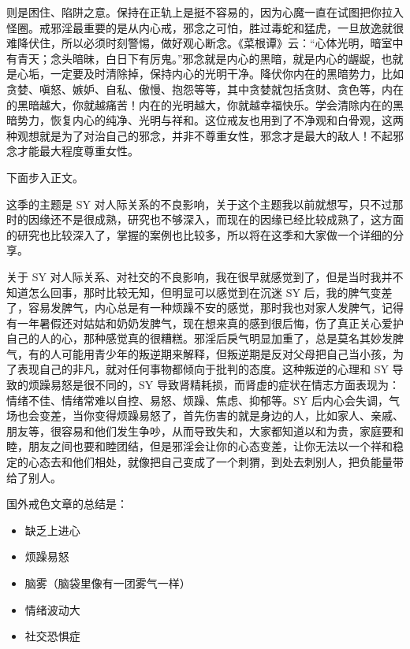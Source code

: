 \begin{case}
则是困住、陷阱之意。保持在正轨上是挺不容易的，因为心魔一直在试图把你拉入怪圈。戒邪淫最重要的是从内心戒，邪念之可怕，胜过毒蛇和猛虎，一旦放逸就很难降伏住，所以必须时刻警惕，做好观心断念。《菜根谭》云：“心体光明，暗室中有青天；念头暗昧，白日下有厉鬼。”邪念就是内心的黑暗，就是内心的龌龊，也就是心垢，一定要及时清除掉，保持内心的光明干净。降伏你内在的黑暗势力，比如贪婪、嗔怒、嫉妒、自私、傲慢、抱怨等等，其中贪婪就包括贪财、贪色等，内在的黑暗越大，你就越痛苦！内在的光明越大，你就越幸福快乐。学会清除内在的黑暗势力，恢复内心的纯净、光明与祥和。这位戒友也用到了不净观和白骨观，这两种观想就是为了对治自己的邪念，并非不尊重女性，邪念才是最大的敌人！不起邪念才能最大程度尊重女性。
\end{case}

下面步入正文。

这季的主题是 SY 对人际关系的不良影响，关于这个主题我以前就想写，只不过那时的因缘还不是很成熟，研究也不够深入，而现在的因缘已经比较成熟了，这方面的研究也比较深入了，掌握的案例也比较多，所以将在这季和大家做一个详细的分享。

关于 SY 对人际关系、对社交的不良影响，我在很早就感觉到了，但是当时我并不知道怎么回事，那时比较无知，但明显可以感觉到在沉迷 SY 后，我的脾气变差了，容易发脾气，内心总是有一种烦躁不安的感觉，那时我也对家人发脾气，记得有一年暑假还对姑姑和奶奶发脾气，现在想来真的感到很后悔，伤了真正关心爱护自己的人的心，那种感觉真的很糟糕。邪淫后戾气明显加重了，总是莫名其妙发脾气，有的人可能用青少年的叛逆期来解释，但叛逆期是反对父母把自己当小孩，为了表现自己的非凡，就对任何事物都倾向于批判的态度。这种叛逆的心理和 SY 导致的烦躁易怒是很不同的，SY 导致肾精耗损，而肾虚的症状在情志方面表现为：情绪不佳、情绪常难以自控、易怒、烦躁、焦虑、抑郁等。SY 后内心会失调，气场也会变差，当你变得烦躁易怒了，首先伤害的就是身边的人，比如家人、亲戚、朋友等，很容易和他们发生争吵，从而导致失和，大家都知道以和为贵，家庭要和睦，朋友之间也要和睦团结，但是邪淫会让你的心态变差，让你无法以一个祥和稳定的心态去和他们相处，就像把自己变成了一个刺猬，到处去刺别人，把负能量带给了别人。

国外戒色文章的总结是：

\begin{multicols}{2}
    \begin{itemize}
        \item 缺乏上进心
        \item 烦躁易怒
        \item 脑雾（脑袋里像有一团雾气一样）
        \item 情绪波动大
        \item 社交恐惧症
    \end{itemize}
\end{multicols}

